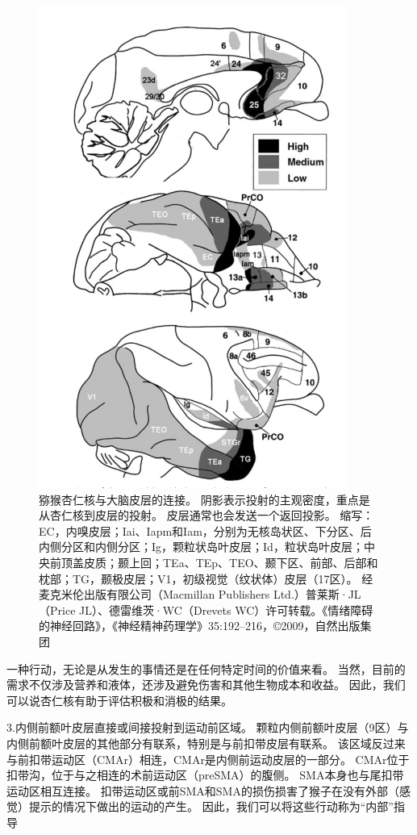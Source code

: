 \begin{figure}[!htb]
	\centering
	\includegraphics{image_pfc/Fig_3_3}
	\caption{猕猴杏仁核与大脑皮层的连接。
		阴影表示投射的主观密度，重点是从杏仁核到皮层的投射。
		皮层通常也会发送一个返回投影。
		缩写：EC，内嗅皮层；Iai、Iapm和Iam，分别为无核岛状区、下分区、后内侧分区和内侧分区；Ig，颗粒状岛叶皮层；Id，粒状岛叶皮层；中央前顶盖皮质；颞上回；TEa、TEp、TEO、颞下区、前部、后部和枕部；TG，颞极皮层；V1，初级视觉（纹状体）皮层（17区）。
		经麦克米伦出版有限公司（Macmillan Publishers Ltd.）普莱斯·JL（Price JL）、德雷维茨·WC（Drevets WC）许可转载。《情绪障碍的神经回路》，《神经精神药理学》35:192–216，©2009，自然出版集团}
	\label{fig:3_3}
\end{figure}


一种行动，无论是从发生的事情还是在任何特定时间的价值来看。
当然，目前的需求不仅涉及营养和液体，还涉及避免伤害和其他生物成本和收益。
因此，我们可以说杏仁核有助于评估积极和消极的结果。\par


3.内侧前额叶皮层直接或间接投射到运动前区域。
颗粒内侧前额叶皮层（9区）与内侧前额叶皮层的其他部分有联系，特别是与前扣带皮层有联系\cite{vogt1987cingulate}。
该区域反过来与前扣带运动区（CMAr）相连，CMAr是内侧前运动皮层的一部分\cite{morecraft1998convergence}。
CMAr位于扣带沟\cite{dum2002motor}，位于与之相连的术前运动区（preSMA）的腹侧\cite{luppino1993corticocortical}。
SMA本身也与尾扣带运动区相互连接\cite{luppino1993corticocortical}。
扣带运动区或前SMA和SMA的损伤损害了猴子在没有外部（感觉）提示的情况下做出的运动的产生\cite{thaler1995functions}。
因此，我们可以将这些行动称为“内部”指导\par


